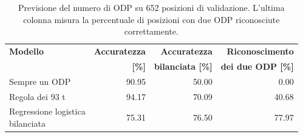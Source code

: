 \begin{table}[htbp]
\centering
\small
\begin{tabular}{@{}lrrr@{}}
\toprule
\textbf{Modello} & \textbf{Accuratezza} & \textbf{Accuratezza} & \textbf{Riconoscimento}\\
& \textbf{[\%]} & \textbf{bilanciata [\%]} & \textbf{dei due ODP [\%]}\\
\midrule
Sempre un ODP & \num{90.95} & \num{50.00} & \num{0.00}\\
Regola dei 93 t & \num{94.17} & \num{70.09} & \num{40.68}\\
\shortstack[l]{Regressione logistica\\bilanciata} & \num{75.31} & \num{76.50} & \num{77.97}\\
\bottomrule
\end{tabular}
\caption{Previsione del numero di ODP su 652 posizioni di validazione. L'ultima colonna misura la percentuale di posizioni con due ODP riconosciute correttamente.}
\label{tab:odp-count-comparison}
\end{table}
